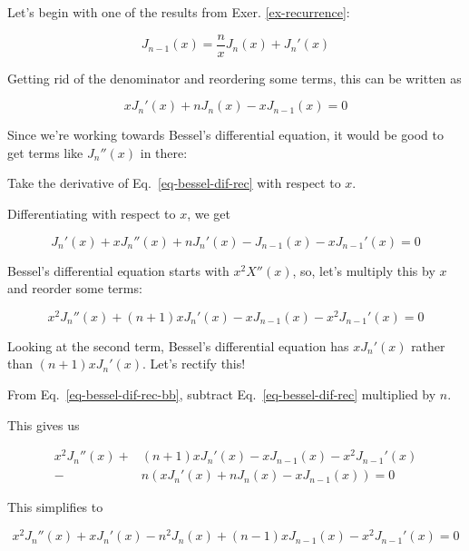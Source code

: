 Let's begin with one of the results from Exer. \ref{ex-recurrence}:

\begin{equation}
J_{n-1}(x) = \frac{n}{x}J_n(x) + J_n'(x)
\end{equation}

Getting rid of the denominator and reordering some terms, this can be written as

\begin{equation}
x J_n'(x) + n J_n(x) - x J_{n-1}(x) = 0 \label{eq-bessel-dif-rec}
\end{equation} 

Since we're working towards Bessel's differential equation, it would be good to get terms like $J_n''(x)$ in there:

\begin{cue}
Take the derivative of Eq.~\ref{eq-bessel-dif-rec} with respect to $x$.
\end{cue}

Differentiating with respect to $x$, we get

\begin{equation}
J_n'(x) + x J_n''(x) + n J_n'(x) - J_{n-1}(x) - x J_{n-1}'(x)= 0
\end{equation} 

Bessel's differential equation starts with $x^2 X''(x)$, so, let's multiply this by $x$ and reorder some terms:

\begin{equation}
x^2 J_n''(x) + (n + 1) x J_n'(x) - x J_{n-1}(x) - x^2 J_{n-1}'(x)= 0 \label{eq-bessel-dif-rec-bb}
\end{equation} 

Looking at the second term, Bessel's differential equation has $x J_n'(x)$ rather than $(n + 1) x J_n'(x)$. Let's rectify this!

\begin{cue}
From Eq.~\ref{eq-bessel-dif-rec-bb}, subtract Eq.~\ref{eq-bessel-dif-rec} multiplied by $n$.
\end{cue}

This gives us

\begin{align}
x^2 J_n''(x) +& (n + 1) x J_n'(x) - x J_{n-1}(x) - x^2 J_{n-1}'(x) \nonumber \\-& n\left(x J_n'(x) + n J_n(x) - x J_{n-1}(x)\right)= 0
\end{align} 

This simplifies to

\begin{equation}
x^2 J_n''(x) +  x J_n'(x) - n^2 J_n(x) + (n - 1) x J_{n-1}(x) - x^2 J_{n-1}'(x)  = 0 \label{eq-bessel-dif-rec-2}
\end{equation} 

